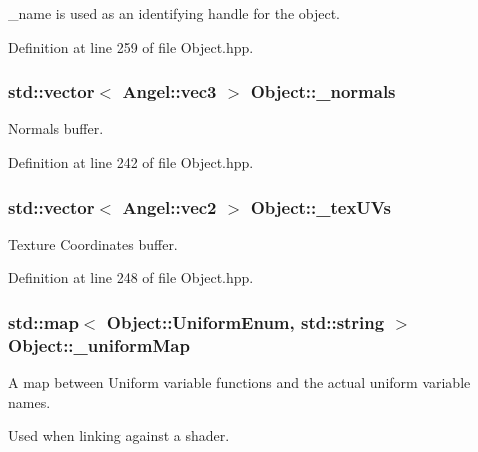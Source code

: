 \-\_\-name is used as an identifying handle for the object. 



Definition at line 259 of file Object.\-hpp.

\hypertarget{class_object_a20bb786cb5915934853855aab9d1a1b3}{
\subsubsection[{\-\_\-normals}]{\setlength{\rightskip}{0pt plus 5cm}std\-::vector$<$ {\bf Angel\-::vec3} $>$ Object\-::\-\_\-normals}}\label{class_object_a20bb786cb5915934853855aab9d1a1b3}


Normals buffer. 



Definition at line 242 of file Object.\-hpp.

\hypertarget{class_object_aa9ddc3b95d74b76ab8a251fb376dfafb}{
\subsubsection[{\-\_\-tex\-U\-Vs}]{\setlength{\rightskip}{0pt plus 5cm}std\-::vector$<$ {\bf Angel\-::vec2} $>$ Object\-::\-\_\-tex\-U\-Vs}}\label{class_object_aa9ddc3b95d74b76ab8a251fb376dfafb}


Texture Coordinates buffer. 



Definition at line 248 of file Object.\-hpp.

\hypertarget{class_object_a6378d0b0eeec23045ae2a5245e42bf13}{
\subsubsection[{\-\_\-uniform\-Map}]{\setlength{\rightskip}{0pt plus 5cm}std\-::map$<$ {\bf Object\-::\-Uniform\-Enum}, std\-::string $>$ Object\-::\-\_\-uniform\-Map\hspace{0.3cm}{\ttfamily [protected]}}}\label{class_object_a6378d0b0eeec23045ae2a5245e42bf13}


A map between Uniform variable functions and the actual uniform variable names. 

Used when linking against a shader. 

